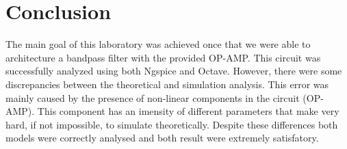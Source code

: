 \section{Conclusion}

The main goal of this laboratory was achieved once that we were able to architecture a bandpass filter with the provided OP-AMP. This circuit was successfully analyzed using both Ngspice and Octave. However, there were some discrepancies between the theoretical and simulation analysis. This error was mainly caused by the presence of non-linear components in the circuit (OP-AMP). This component has an imensity of different parameters that make very hard, if not impossible, to simulate theoretically. 
Despite these differences both models were correctly analysed and both result were extremely satisfatory. 
